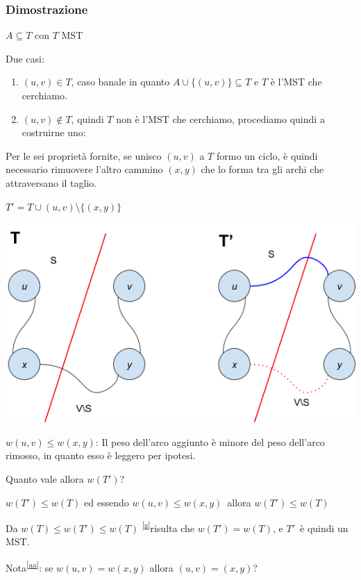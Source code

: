 \documentclass{article}
\providecommand{\tightlist}{%
  \setlength{\itemsep}{0pt}\setlength{\parskip}{0pt}}
\begin{document}
{{{\subsubsection{Dimostrazione}

{$A \subseteq T$ con $T$ MST}

{Due casi:}

\begin{enumerate}
\tightlist
\item
  {$(u,v) \in T$, caso banale in quanto $A \cup \{(u,v)\} \subseteq T$  e $T$ è l'MST che cerchiamo.}
\item
  {$(u,v) \notin T$, quindi $T$ non è l'MST che cerchiamo, procediamo quindi a costruirne uno:}
\end{enumerate}

{Per le sei proprietà fornite, se unisco $(u,v)$ a $T$ formo un ciclo, è quindi necessario rimuovere l'altro cammino $(x,y)$ che lo forma tra gli archi che attraversano il taglio. }

$T' = T \cup {(u,v)} \setminus \{(x,y)\} $

{\includegraphics{images/image530.png}}

$w(u,v) \leq w(x,y)${: Il peso dell'arco aggiunto è minore del peso dell'arco rimosso, in quanto esso è leggero per ipotesi.}

{Quanto vale allora $w(T')$? }

$w(T') \leq w(T)$ {ed essendo }$w(u,v) \leq w(x,y)${~allora $w(T') \leq w(T)$}

{Da }$w(T) \leq w(T') \leq w(T)$ \textsuperscript{\protect\hyperlink{cmnt26}{{[}z{]}}}{risulta che $w(T') = w(T)$, e }$T'${~è quindi un MST.}

{Nota}\textsuperscript{\protect\hyperlink{cmnt27}{{[}aa{]}}}{: se $w(u,v) = w(x,y)$ allora $(u,v) = (x,y)$?}

}}}
\end{document}
